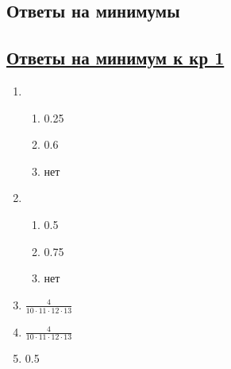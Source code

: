 
\subsection*{Ответы на минимумы}

\subsection*{\hyperref[sec:minimum_kr_01]{Ответы на минимум к кр 1}}
\label{sec:sol_minimum_kr_01}

\begin{enumerate}
	\item
			\begin{enumerate}
				\item 0.25
				\item 0.6
				\item нет
			\end{enumerate}
	\item
			\begin{enumerate}
				\item 0.5
				\item  0.75
				\item нет
			\end{enumerate}
	\item $\frac{4}{10 \cdot 11 \cdot 12 \cdot 13}$
	\item $\frac{4}{10 \cdot 11 \cdot 12 \cdot 13}$
	\item 0.5



\end{enumerate}
